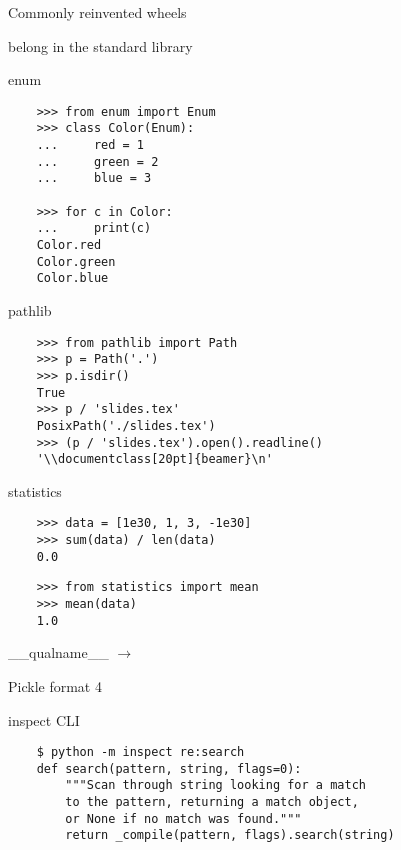 \documentclass[20pt]{beamer}
\renewcommand\emph[1]{\textcolor{taskyblue}{#1}}
\newcommand\muted[1]{{\textcolor{muted}{#1}}}
\newcommand\fromthreethree[1]{{\muted{#1 $\rightarrow$}\bigskip}}
\begin{document}
\begin{center}
\begin{frame}[fragile]
    Commonly reinvented wheels

    \pause

    belong in the standard library
\end{frame}

\begin{frame}[fragile]
    \emph{enum}
    \bigskip

    \tiny
    \begin{verbatim}
    >>> from enum import Enum
    >>> class Color(Enum):
    ...     red = 1
    ...     green = 2
    ...     blue = 3

    >>> for c in Color:
    ...     print(c)
    Color.red
    Color.green
    Color.blue
    \end{verbatim}
\end{frame}

\begin{frame}[fragile]
    \emph{pathlib}
    \bigskip

    \tiny
    \begin{verbatim}
    >>> from pathlib import Path
    >>> p = Path('.')
    >>> p.isdir()
    True
    >>> p / 'slides.tex'
    PosixPath('./slides.tex')
    >>> (p / 'slides.tex').open().readline()
    '\\documentclass[20pt]{beamer}\n'
    \end{verbatim}
\end{frame}

\begin{frame}[fragile]
    \emph{statistics}
    \bigskip

    \tiny
    \begin{verbatim}
    >>> data = [1e30, 1, 3, -1e30]
    >>> sum(data) / len(data)
    0.0
    \end{verbatim}

    \begin{verbatim}
    >>> from statistics import mean
    >>> mean(data)
    1.0
    \end{verbatim}
\end{frame}

\begin{frame}[fragile]
    \fromthreethree{\_\_qualname\_\_}

    Pickle format 4
\end{frame}

\begin{frame}[fragile]
    inspect \emph{CLI}
    \bigskip

    \tiny
    \begin{verbatim}
    $ python -m inspect re:search
    def search(pattern, string, flags=0):
        """Scan through string looking for a match
        to the pattern, returning a match object,
        or None if no match was found."""
        return _compile(pattern, flags).search(string)
    \end{verbatim}
\end{frame}


\end{center}
\end{document}
